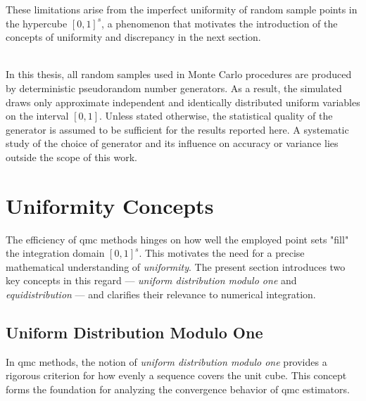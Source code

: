 These limitations arise from the imperfect uniformity of random sample points
in the hypercube $[0,1]^s$, a phenomenon that motivates the introduction of the
concepts of uniformity and discrepancy in the next section.

\begin{remark}\ \\
In this thesis, all random samples used in Monte Carlo procedures are produced
by deterministic pseudorandom number generators. As a result, the simulated
draws only approximate independent and identically distributed uniform variables
on the interval $[0,1]$. Unless stated otherwise, the statistical quality of the
generator is assumed to be sufficient for the results reported here. A
systematic study of the choice of generator and its influence on accuracy or
variance lies outside the scope of this work.
\end{remark}


\section{Uniformity Concepts}
\label{sec:uniformity-concepts}

The efficiency of \ac{qmc} methods hinges on how well the employed point sets
"fill" the integration domain $[0,1]^s$. This motivates the need for a precise
mathematical understanding of \emph{uniformity}. The present section introduces
two key concepts in this regard --- \emph{uniform distribution modulo one} and
\emph{equidistribution} --- and clarifies their relevance to numerical
integration.

\subsection{Uniform Distribution Modulo One}

In \ac{qmc} methods, the notion of \emph{uniform distribution modulo one}
provides a rigorous criterion for how evenly a sequence covers the unit cube.
This concept forms the foundation for analyzing the convergence behavior of \ac{qmc}
estimators.

